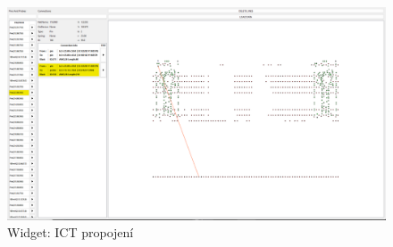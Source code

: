 \begin{figure}[ht!]
    \centering
    \includegraphics[width = 1\textwidth]{obrazky/PC_APP_dataViewer.png}
    \caption{Widget:  ICT propojení}
    \label{fig: PCAPP ICT propojeni}
\end{figure}
